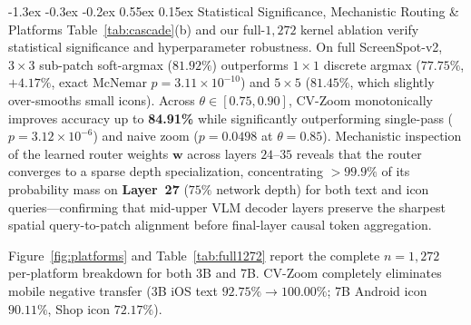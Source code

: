 \documentclass[10pt,twocolumn,letterpaper]{article}
\makeatletter
\renewcommand\subsection{\@startsection{subsection}{2}{\z@}%
  {-1.3ex \@plus -0.3ex \@minus -0.2ex}%
  {0.55ex \@plus 0.15ex}%
  {\normalfont\normalsize\bfseries\color{navy!85!black}}}
\makeatother
\begin{document}
\subsection{Statistical Significance, Mechanistic Routing \& Platforms}
Table~\ref{tab:cascade}(b) and our full-$1{,}272$ kernel ablation verify statistical significance and hyperparameter robustness. On full ScreenSpot-v2, $3{\times}3$ sub-patch soft-argmax ($81.92\%$) outperforms $1{\times}1$ discrete argmax ($77.75\%$, $+4.17\%$, exact McNemar $p{=}3.11{\times}10^{-10}$) and $5{\times}5$ ($81.45\%$, which slightly over-smooths small icons). Across $\theta \in [0.75, 0.90]$, CV-Zoom monotonically improves accuracy up to \textbf{84.91\%} while significantly outperforming single-pass ($p{=}3.12{\times}10^{-6}$) and naive zoom ($p{=}0.0498$ at $\theta{=}0.85$). Mechanistic inspection of the learned router weights $\bm{w}$ across layers $24\text{--}35$ reveals that the router converges to a sparse depth specialization, concentrating $>99.9\%$ of its probability mass on \textbf{Layer~27} ($75\%$ network depth) for both text and icon queries---confirming that mid-upper VLM decoder layers preserve the sharpest spatial query-to-patch alignment before final-layer causal token aggregation.

Figure~\ref{fig:platforms} and Table~\ref{tab:full1272} report the complete $n{=}1{,}272$ per-platform breakdown for both 3B and 7B. CV-Zoom completely eliminates mobile negative transfer (3B iOS text $92.75\% \rightarrow \mathbf{100.00\%}$; 7B Android icon $\mathbf{90.11\%}$, Shop icon $\mathbf{72.17\%}$).
\end{document}
